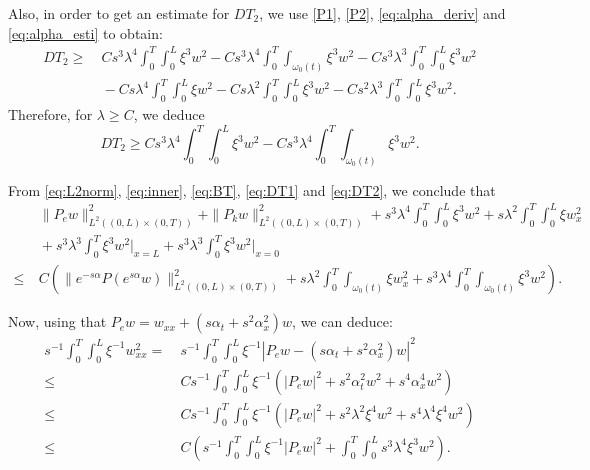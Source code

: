 \documentclass[10pt]{article}
\def\om{\omega}
\def\\Phivec{\mathbf{\Phi}}
\newcommand{\ii}{\iiTL }
\newcommand{\iiTL}{\int_0^T\!\!\!\!\int_0^L }
\begin{document}
\begin{appendix}
	Also, in order to get an estimate for $DT_2$, we use
	\eqref{P1}, \eqref{P2}, \eqref{eq:alpha_deriv} and \eqref{eq:alpha_esti} to obtain:
\begin{align*}\label{eq:BT}
	DT_2
	\geq&~ Cs^3\lambda^4\ii\xi^3 w^2- Cs^3\lambda^4\int_0^T\!\!\!\int_{\om_0(t)}\xi^3 w^2
	-Cs^3\lambda^3\ii\xi^3 w^2\\
	&~-Cs\lambda^4\ii \xi w^2-Cs\lambda^2\ii \xi^3 w^2 - Cs^2\lambda^3\ii\xi^3 w^2.
\end{align*}	
	Therefore, for $\lambda\geq C$, we deduce
\begin{equation}\label{eq:DT2}
	DT_2
	\geq Cs^3\lambda^4\ii\xi^3 w^2- Cs^3\lambda^4\int_0^T\!\!\!\int_{\om_0(t)}\xi^3 w^2.
\end{equation}	

	From \eqref{eq:L2norm}, \eqref{eq:inner}, \eqref{eq:BT},  \eqref{eq:DT1} and \eqref{eq:DT2}, we
	conclude that
\begin{equation}\label{eq:concl1}
\begin{alignedat}{2}
	&~\|P_e w\|^2_{L^2((0,L)\times(0,T))}+\|P_k w\|^2_{L^2((0,L)\times(0,T))}+s^3\lambda^4\ii\xi^3 w^2+s\lambda^2\ii \xi w_x^2\\
	&~+s^3\lambda^3\int_0^T\xi^3 w^2\big|_{x=L}+s^3\lambda^3\int_0^T\xi^3 w^2\big|_{x=0}\\
	\leq&~ C\left(\|e^{-s\alpha} P(e^{s\alpha} w )\|^2_{L^2((0,L)\times(0,T))} +
	s\lambda^2\int_0^T\!\!\!\int_{\om_0(t)}\xi w_x^2
	+s^3\lambda^4\int_0^T\!\!\!\int_{\om_0(t)}\xi^3 w^2\right).
\end{alignedat}
\end{equation}
	
	Now, using that $P_{e} w=w_{xx}+(s\alpha_t+s^2\alpha_x^2)w$, we can deduce:
\begin{equation}\label{eq:laplac}
\begin{alignedat}{2}
	s^{-1}\ii\xi^{-1} w^2_{xx}
	=&~ s^{-1}\ii\xi^{-1}  |P_e w-(s\alpha_t+s^2\alpha_x^2)w|^2\\
	\leq&~ C s^{-1}\ii\xi^{-1}\left(  |P_e w|^2+ s^2\alpha_t^2w^2+s^4\alpha_x^4w^2\right)\\
	\leq&~ C s^{-1}\ii\xi^{-1}\left(  |P_e w|^2+ s^2\lambda^2\xi^4w^2+s^4\lambda^4\xi^4w^2\right)\\
	\leq&~ C\left( s^{-1}\ii\xi^{-1} |P_e w|^2+\ii s^3\lambda^4\xi^3w^2\right).
\end{alignedat}
\end{equation}


\end{appendix}
\end{document}
